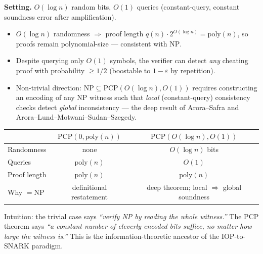 \textbf{Setting.} $O(\log n)$ random bits, $O(1)$ queries
(constant-query, constant soundness error after amplification).

\begin{itemize}
  \item $O(\log n)$ randomness $\Rightarrow$ proof length $q(n)\cdot 2^{O(\log n)} = \mathrm{poly}(n)$,
        so proofs remain polynomial-size --- consistent with $\mathrm{NP}$.
  \item Despite querying only $O(1)$ symbols, the verifier can detect
        \emph{any} cheating proof with probability $\geq 1/2$ (boostable
        to $1-\varepsilon$ by repetition).
  \item Non-trivial direction: $\mathrm{NP}\subseteq \mathrm{PCP}(O(\log n),O(1))$
        requires constructing an encoding of any NP witness such that
        \emph{local} (constant-query) consistency checks detect \emph{global}
        inconsistency --- the deep result of Arora--Safra and
        Arora--Lund--Motwani--Sudan--Szegedy.
\end{itemize}

\begin{center}
\small
\begin{tabular}{l|c|c}
 & $\mathrm{PCP}(0,\mathrm{poly}(n))$ & $\mathrm{PCP}(O(\log n),O(1))$ \\\hline
Randomness & none & $O(\log n)$ bits \\
Queries & $\mathrm{poly}(n)$ & $O(1)$ \\
Proof length & $\mathrm{poly}(n)$ & $\mathrm{poly}(n)$ \\
Why $= \mathrm{NP}$ & definitional restatement & deep theorem; local $\Rightarrow$ global soundness \\
\end{tabular}
\end{center}

Intuition: the trivial case says \emph{``verify NP by reading the whole witness.''}
The PCP theorem says \emph{``a constant number of cleverly encoded bits suffice,
no matter how large the witness is.''} This is the information-theoretic ancestor
of the IOP-to-SNARK paradigm.
